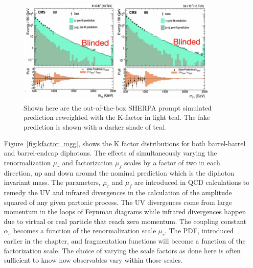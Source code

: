 \begin{figure}[tbp!]
\begin{center}
\includegraphics[angle=0,width=0.9\textwidth]{fig/diphotonblinded.png}
\end{center}
\caption{Shown here are the out-of-the-box SHERPA prompt simulated \mgg prediction reweighted with the K-factor in light teal. The fake prediction is shown with a darker shade of teal.}
\label{fig:SMBackgroundKfactorreweighted}
\end{figure}

Figure~\ref{fig:kfactor_mgg}, shows the K factor distributions for both barrel-barrel and barrel-endcap diphotons. The effects of simultaneously varying the renormalization $\mu_{r}$ and factorization $\mu_{f}$ scales by a factor of two in each direction, up and down around the nominal prediction which is the diphoton invariant mass. The parameters, $\mu_{r}$ and $\mu_{f}$ are introduced in QCD calculations to remedy the UV and infrared divergences in the calculation of the amplitude squared of any given partonic process. The UV divergences come from large momentum in the loops of Feynman diagrams while infrared divergences happen due to virtual or real particle that reach zero momentum. The coupling constant $\alpha_{s}$ becomes a function of the renormalization scale $\mu_{r}$. The PDF, introduced earlier in the chapter, and fragmentation functions will become a function of the factorization scale. The choice of varying the scale factors as done here is often sufficient to know how observables vary within those scales.



